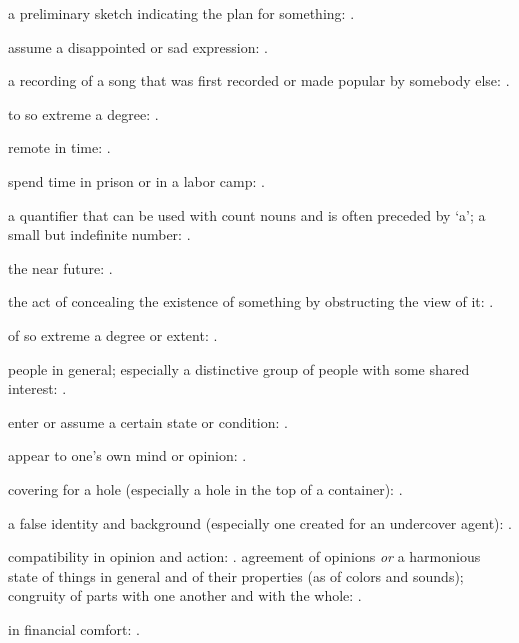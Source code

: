   a preliminary sketch indicating the plan for something: .

  assume a disappointed or sad expression: .

  a recording of a song that was first recorded or made popular by somebody else:   .

  to so extreme a degree: .

  remote in time: .

  spend time in prison or in a labor camp:   .

  a quantifier that can be used with count nouns and is often preceded by `a'; a small but indefinite number: .

  the near future: .

  the act of concealing the existence of something by obstructing the view of it:   .

  of so extreme a degree or extent: .

  people in general; especially a distinctive group of people with some shared interest:   .

  enter or assume a certain state or condition:   .

  appear to one's own mind or opinion: .

  covering for a hole (especially a hole in the top of a container):   .

  a false identity and background (especially one created for an undercover agent): .

  compatibility in opinion and action:   . agreement of opinions \textit{or} a harmonious state of things in general and of their properties (as of colors and sounds); congruity of parts with one another and with the whole:   .

  in financial comfort:   .

